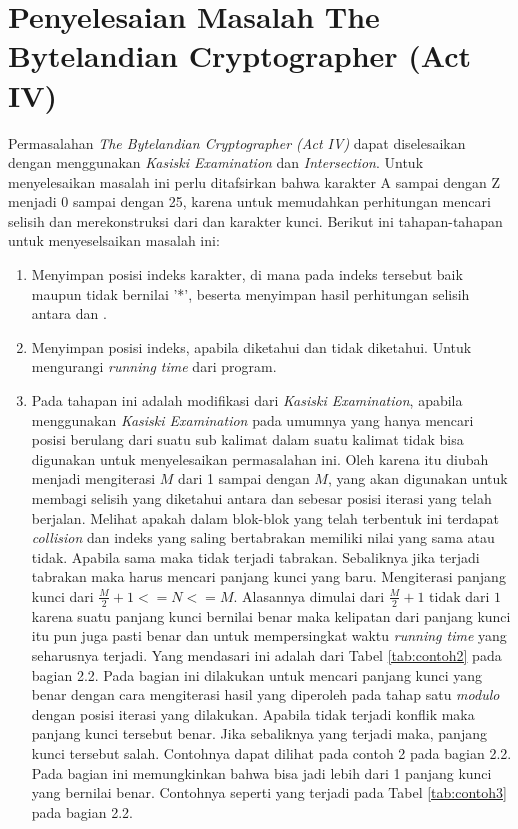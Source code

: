 	\section{Penyelesaian Masalah The Bytelandian Cryptographer (Act IV)}
	\label{chapter:solving}
	Permasalahan \textit{The Bytelandian Cryptographer (Act IV)} dapat diselesaikan dengan menggunakan \textit{Kasiski Examination} dan \textit{Intersection}. Untuk menyelesaikan masalah ini perlu ditafsirkan bahwa karakter A sampai dengan Z menjadi 0 sampai dengan 25, karena untuk memudahkan perhitungan mencari selisih dan merekonstruksi \plaintext dari \ciphertext dan karakter kunci. Berikut ini tahapan-tahapan untuk menyeselsaikan masalah ini:
	\begin{enumerate}
	\item Menyimpan posisi indeks karakter, di mana pada indeks tersebut baik \ciphertext maupun \plaintext tidak bernilai '*', beserta menyimpan hasil perhitungan selisih antara \ciphertext dan \plaintext\cite{john_jones_spoj_2009}.
	\item Menyimpan posisi indeks, apabila  \ciphertext diketahui dan \plaintext tidak diketahui. Untuk mengurangi \textit{running time} dari program\cite{john_jones_spoj_2009}.
	\item Pada tahapan ini adalah modifikasi dari \textit{Kasiski Examination}, apabila menggunakan \textit{Kasiski Examination} pada umumnya yang hanya mencari posisi berulang dari suatu sub kalimat dalam suatu kalimat tidak bisa digunakan untuk menyelesaikan permasalahan ini. Oleh karena itu diubah menjadi mengiterasi $M$ dari 1 sampai dengan $M$, yang akan digunakan untuk membagi selisih yang diketahui antara \plaintext dan \ciphertext sebesar posisi iterasi yang telah berjalan. Melihat apakah dalam blok-blok yang telah terbentuk ini terdapat \textit{collision} dan indeks yang saling bertabrakan memiliki nilai yang sama atau tidak. Apabila sama maka tidak terjadi tabrakan. Sebaliknya jika terjadi tabrakan maka harus mencari panjang kunci yang baru. Mengiterasi panjang kunci dari $\frac{M}{2}+1<=N<=M$. Alasannya dimulai dari $\frac{M}{2}+1$ tidak dari $1$ karena suatu panjang kunci bernilai benar maka kelipatan dari panjang kunci itu pun juga pasti benar dan untuk mempersingkat waktu \textit{running time} yang seharusnya terjadi. Yang mendasari ini adalah dari Tabel  \ref{tab:contoh2} pada bagian 2.2. Pada bagian ini dilakukan untuk mencari panjang kunci yang benar dengan cara mengiterasi hasil yang diperoleh pada tahap satu \textit{modulo} dengan posisi iterasi yang dilakukan. Apabila tidak terjadi konflik maka panjang kunci tersebut benar. Jika sebaliknya yang terjadi maka, panjang kunci tersebut salah. Contohnya dapat dilihat pada contoh 2 pada bagian 2.2. Pada bagian ini memungkinkan bahwa bisa jadi lebih dari 1 panjang kunci yang bernilai benar. Contohnya seperti yang terjadi pada Tabel \ref{tab:contoh3} pada bagian 2.2. 

\end{enumerate}
